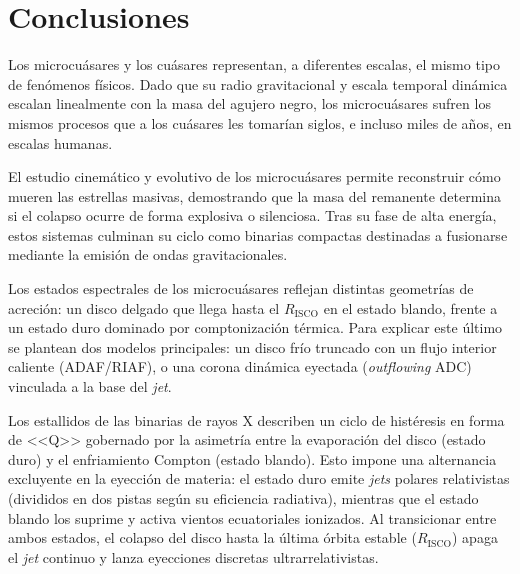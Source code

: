 \section{Conclusiones}
\noindent Los microcuásares y los cuásares representan, a diferentes escalas, el mismo tipo de fenómenos físicos. Dado que su radio gravitacional y escala temporal dinámica escalan linealmente con la masa del agujero negro, los microcuásares sufren los mismos procesos que a los cuásares les tomarían siglos, e incluso miles de años, en escalas humanas.  

\noindent El estudio cinemático y evolutivo de los microcuásares permite reconstruir cómo mueren las estrellas masivas, demostrando que la masa del remanente determina si el colapso ocurre de forma explosiva o silenciosa. Tras su fase de alta energía, estos sistemas culminan su ciclo como binarias compactas destinadas a fusionarse mediante la emisión de ondas gravitacionales. 

\noindent Los estados espectrales de los microcuásares reflejan distintas geometrías de acreción: un disco delgado que llega hasta el $R_{\text{ISCO}}$ en el estado blando, frente a un estado duro dominado por comptonización térmica. Para explicar este último se plantean dos modelos principales: un disco frío truncado con un flujo interior caliente (ADAF/RIAF), o una corona dinámica eyectada (\textit{outflowing} ADC) vinculada a la base del \textit{jet}. 

\noindent Los estallidos de las binarias de rayos X describen un ciclo de histéresis en forma de <<Q>> gobernado por la asimetría entre la evaporación del disco (estado duro) y el enfriamiento Compton (estado blando). Esto impone una alternancia excluyente en la eyección de materia: el estado duro emite \textit{jets} polares relativistas (divididos en dos pistas según su eficiencia radiativa), mientras que el estado blando los suprime y activa vientos ecuatoriales ionizados. Al transicionar entre ambos estados, el colapso del disco hasta la última órbita estable ($R_{\text{ISCO}}$) apaga el \textit{jet} continuo y lanza eyecciones discretas ultrarrelativistas. 